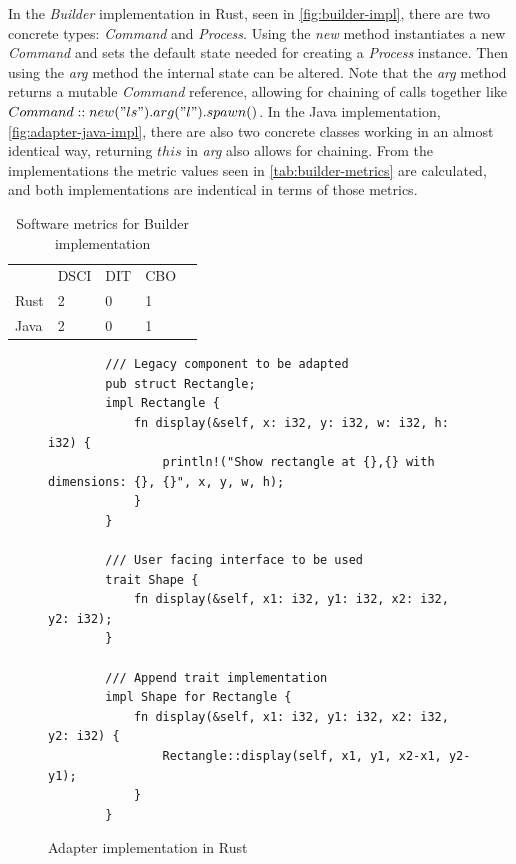 \documentclass[conference]{IEEEtran}
\begin{document}
In the \emph{Builder} implementation in Rust, seen in \autoref{fig:builder-impl}, there are two concrete types: \emph{Command} and \emph{Process}.
Using the \emph{new} method instantiates a new \emph{Command} and sets the default state needed for creating a \emph{Process} instance.
Then using the \emph{arg} method the internal state can be altered.
Note that the \emph{arg} method returns a mutable \emph{Command} reference, allowing for chaining of calls together like $Command::new("ls").arg("l").spawn()$.
In the Java implementation, \autoref{fig:adapter-java-impl}, there are also two concrete classes working in an almost identical way, returning $this$ in \emph{arg} also allows for chaining.
From the implementations the metric values seen in \autoref{tab:builder-metrics} are calculated, and both implementations are indentical in terms of those metrics.

\begin{table}[hbtp]
    \centering
    \caption{Software metrics for Builder implementation}
    \label{tab:builder-metrics}
    \begin{tabular}{lllll}
        & DSCI   & DIT  & CBO   &  \\
        Rust & 2 & 0    & 1     &  \\
        Java & 2 & 0    & 1     &  \\
    \end{tabular}
\end{table}

\begin{figure}[btp]
    \begin{verbatim}
        /// Legacy component to be adapted
        pub struct Rectangle;
        impl Rectangle {
            fn display(&self, x: i32, y: i32, w: i32, h: i32) {
                println!("Show rectangle at {},{} with dimensions: {}, {}", x, y, w, h);
            }
        }

        /// User facing interface to be used
        trait Shape {
            fn display(&self, x1: i32, y1: i32, x2: i32, y2: i32);
        }

        /// Append trait implementation
        impl Shape for Rectangle {
            fn display(&self, x1: i32, y1: i32, x2: i32, y2: i32) {
                Rectangle::display(self, x1, y1, x2-x1, y2-y1);
            }
        }
    \end{verbatim}
    \caption{Adapter implementation in Rust}
    \label{fig:adapter-impl}
\end{figure}
\end{document}
